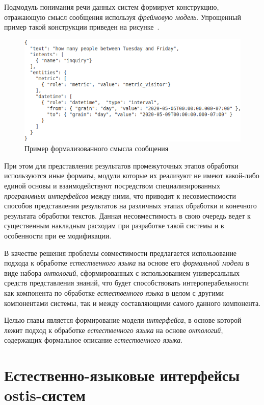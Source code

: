 Подмодуль понимания речи данных систем формирует конструкцию, отражающую смысл сообщения используя \textit{фреймовую модель}.
Упрощенный пример такой конструкции приведен на рисунке~\textit{}.

\begin{figure}[h]
    \centerline{\includegraphics[scale=0.55]{images/part4/chapter_nl_interfaces/message_intents}}
    \caption{Пример формализованного смысла сообщения}
    \label{fig:message_intents}
\end{figure}

При этом для представления результатов промежуточных этапов обработки используются иные форматы, модули которые их реализуют не имеют какой-либо единой основы и взаимодействуют посредством специализированных \textit{программных интерфейсов} между ними, что приводит к несовместимости способов представления результатов на различных этапах обработки и конечного результата обработки текстов.
Данная несовместимость в свою очередь ведет к существенным накладным расходам при разработке такой системы и в особенности при ее модификации.

В качестве решения проблемы совместимости предлагается использование подхода к обработке \textit{естественного языка} на основе его \textit{формальной модели} в виде набора \textit{онтологий}, сформированных с использованием универсальных средств представления знаний, что будет способствовать интероперабельности как компонента по обработке \textit{естественного языка} в целом с другими компонентами системы, так и между составляющими самого данного компонента.

Целью главы является формирование модели \textit{интерфейса}, в основе которой лежит подход к обработке \textit{естественного языка} на основе \textit{онтологий}, содержащих формальное описание \textit{естественного языка}.

\section{Естественно-языковые интерфейсы ostis-систем}
\label{section_natural_language_interface}

